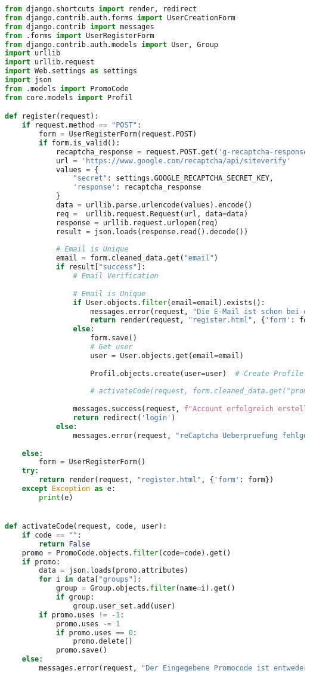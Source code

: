 \begin{lstlisting}[language=Python]
from django.shortcuts import render, redirect
from django.contrib.auth.forms import UserCreationForm
from django.contrib import messages
from .forms import UserRegisterForm
from django.contrib.auth.models import User, Group
import urllib
import urllib.request
import Web.settings as settings
import json
from .models import PromoCode
from core.models import Profil

def register(request):
    if request.method == "POST":
        form = UserRegisterForm(request.POST)
        if form.is_valid():
            recaptcha_response = request.POST.get('g-recaptcha-response')
            url = 'https://www.google.com/recaptcha/api/siteverify'
            values = {
                "secret": settings.GOOGLE_RECAPTCHA_SECRET_KEY,
                'response': recaptcha_response
            }
            data = urllib.parse.urlencode(values).encode()
            req =  urllib.request.Request(url, data=data)
            response = urllib.request.urlopen(req)
            result = json.loads(response.read().decode())
            
            # Email is Unique
            email = form.cleaned_data.get("email")
            if result["success"]:
                # Email Verification
                
                # Email is Unique
                if User.objects.filter(email=email).exists():
                    messages.error(request, "Die E-Mail ist schon bei einem anderen Account verwendet worden.")
                    return render(request, "register.html", {'form': form})
                else:
                    form.save()
                    # Get user
                    user = User.objects.get(email=email)
                    
                    Profil.objects.create(user=user)  # Create Profile for the new created user.
                    
                    # activateCode(request, form.cleaned_data.get("promoCode"), user)
                
                messages.success(request, f"Account erfolgreich erstellt!")
                return redirect('login')
            else:
                messages.error(request, "reCaptcha Ueberpruefung fehlgeschlagen. Versuche es bitte erneut.")
            
    else:
        form = UserRegisterForm()
    try:
        return render(request, "register.html", {'form': form})
    except Exception as e:
        print(e)


def activateCode(request, code, user):
    if code == "":
        return False
    promo = PromoCode.objects.filter(code=code).get()
    if promo:
        data = json.loads(promo.attributes)
        for i in data["groups"]:
            group = Group.objects.filter(name=i).get()
            if group:
                group.user_set.add(user)
        if promo.uses != -1:
            promo.uses -= 1
            if promo.uses == 0:
                promo.delete()
            promo.save()
    else:
        messages.error(request, "Der Eingegebene Promocode ist entweder falsch geschrieben oder nicht existent")
        

\end{lstlisting}